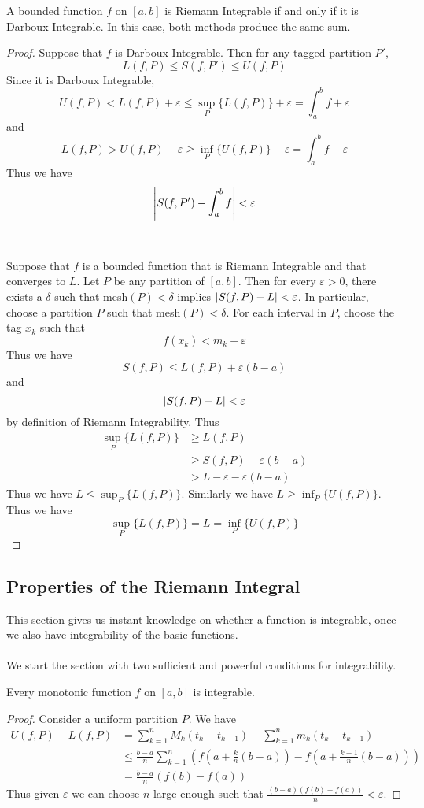 \documentclass[a4paper]{article}
\begin{document}
\begin{thm}{}{} A bounded function $f$ on $[a,b]$ is Riemann Integrable if and only if it is Darboux Integrable. In this case, both methods produce the same sum. \tcbline
\begin{proof} Suppose that $f$ is Darboux Integrable. Then for any tagged partition $P'$, $$L(f,P)\leq S(f,P')\leq U(f,P)$$ Since it is Darboux Integrable, $$U(f,P)<L(f,P)+\varepsilon\leq\sup_P\{L(f,P)\}+\varepsilon=\int_a^b f+\varepsilon$$ and $$L(f,P)>U(f,P)-\varepsilon\geq\inf_P\{U(f,P)\}-\varepsilon=\int_a^b f-\varepsilon$$ Thus we have $$\abs{S(f,P')-\int_a^b f}<\varepsilon$$ \\~\\
Suppose that $f$ is a bounded function that is Riemann Integrable and that converges to $L$. Let $P$ be any partition of $[a,b]$. Then for every $\varepsilon>0$, there exists a $\delta$ such that mesh$(P)<\delta$ implies $\abs{S(f,P)-L}<\varepsilon$. In particular, choose a partition $P$ such that mesh$(P)<\delta$. For each interval in $P$, choose the tag $x_k$ such that $$f(x_k)<m_k+\varepsilon$$ Thus we have $$S(f,P)\leq L(f,P)+\varepsilon(b-a)$$ and $$\abs{S(f,P)-L}<\varepsilon$$ by definition of Riemann Integrability. Thus 
\begin{align*}
\sup_P\{L(f,P)\}&\geq L(f,P)\\
&\geq S(f,P)-\varepsilon(b-a)\\
&>L-\varepsilon-\varepsilon(b-a)
\end{align*}
Thus we have $L\leq\sup_P\{L(f,P)\}$. Similarly we have $L\geq\inf_P\{U(f,P)\}$. Thus we have $$\sup_P\{L(f,P)\}=L=\inf_P\{U(f,P)\}$$
\end{proof}
\end{thm}

\subsection{Properties of the Riemann Integral}
This section gives us instant knowledge on whether a function is integrable, once we also have integrability of the basic functions. \\~\\
We start the section with two sufficient and powerful conditions for integrability. 
\begin{thm}{}{} Every monotonic function $f$ on $[a,b]$ is integrable. \tcbline
\begin{proof} Consider a uniform partition $P$. We have 
\begin{align*}
U(f,P)-L(f,P)&=\sum_{k=1}^nM_k(t_k-t_{k-1})-\sum_{k=1}^nm_k(t_k-t_{k-1})\\
&\leq\frac{b-a}{n}\sum_{k=1}^n\left(f\left(a+\frac{k}{n}(b-a)\right)-f\left(a+\frac{k-1}{n}(b-a)\right)\right)\\
&=\frac{b-a}{n}(f(b)-f(a))
\end{align*}
Thus given $\varepsilon$ we can choose $n$ large enough such that $\frac{(b-a)(f(b)-f(a))}{n}<\varepsilon$. 
\end{proof}
\end{thm}
\end{document}
